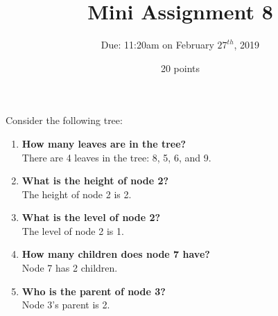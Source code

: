 \documentclass[12pt]{article}
\begin{document}
 
\title{Mini Assignment 8}
\author{Due: 11:20am on February $27^{th}$, 2019}
\date{20 points}
\maketitle

Consider the following tree:


\begin{enumerate}
	\item \textbf{How many leaves are in the tree?} \\
	\qquad There are 4 leaves in the tree: 8, 5, 6, and 9. \\
    \item \textbf{What is the height of node 2?} \\
    \qquad The height of node 2 is 2. \\
	\item \textbf{What is the level of node 2?} \\
	\qquad The level of node 2 is 1. \\
	\item \textbf{How many children does node 7 have?} \\
	\qquad Node 7 has 2 children. \\
    \item \textbf{Who is the parent of node 3?} \\
    \qquad Node 3's parent is 2.
\end{enumerate}
\end{document}
